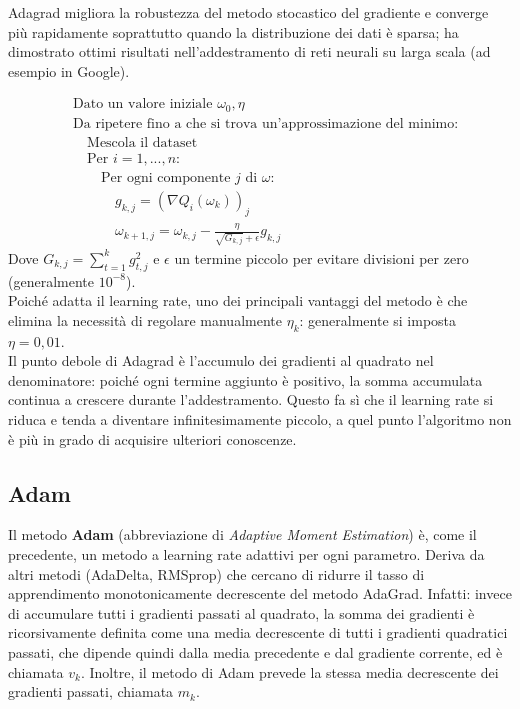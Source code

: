 Adagrad migliora la robustezza del metodo stocastico del gradiente e converge più rapidamente soprattutto quando la distribuzione dei dati è sparsa; ha dimostrato ottimi risultati nell'addestramento di reti neurali su larga scala (ad esempio in Google).

\begin{align*}
    &\text{Dato un valore iniziale }\omega_0, \eta\\
    &\text{Da ripetere fino a che si trova un'approssimazione del minimo:}\\
    &\quad\text{Mescola il dataset}\\
    &\quad\text{Per }i=1,...,n:\\
    &\quad\quad \text{Per ogni componente $j$ di $\omega$:}\\
    &\quad\quad\quad g_{k,j}=(\nabla Q_i(\omega_k))_j\\
    &\quad\quad\quad\omega_{k+1,j}=\omega_{k,j} - \frac{\eta}{\sqrt{G_{k,j}}+\epsilon}g_{k,j}
\end{align*}
Dove $G_{k,j}=\sum_{t=1}^{k}g_{t,j}^2$ e $\epsilon$ un termine piccolo per evitare divisioni per zero (generalmente $10^{-8}$).\\
Poiché adatta il learning rate, uno dei principali vantaggi del metodo è che elimina la necessità di regolare manualmente $\eta_k$: generalmente si imposta $\eta=0,01$.\\
Il punto debole di Adagrad è l'accumulo dei gradienti al quadrato nel denominatore: poiché ogni termine aggiunto è positivo, la somma accumulata continua a crescere durante l'addestramento. Questo fa sì che il learning rate si riduca e tenda a diventare infinitesimamente piccolo, a quel punto l'algoritmo non è più in grado di acquisire ulteriori conoscenze.


\newpage
\subsection{Adam \cite{kingma_adam_2017}}\label{adam}
Il metodo \textbf{Adam} (abbreviazione di \textit{Adaptive Moment Estimation}) è, come il precedente, un metodo a learning rate adattivi per ogni parametro. Deriva da altri metodi (AdaDelta, RMSprop) che cercano di ridurre il tasso di apprendimento monotonicamente decrescente del metodo AdaGrad. Infatti: invece di accumulare tutti i gradienti passati al quadrato, la somma dei gradienti è ricorsivamente definita come una media decrescente di tutti i gradienti quadratici passati, che dipende quindi dalla media precedente e dal gradiente corrente, ed è chiamata $v_k$. Inoltre, il metodo di Adam prevede la stessa media decrescente dei gradienti passati, chiamata $m_k$.


